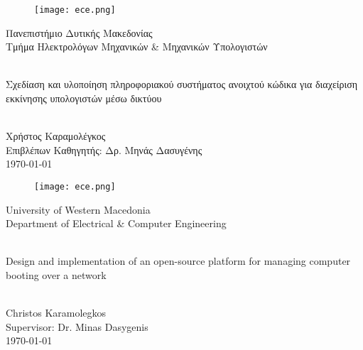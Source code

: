 \begin{titlepage}
	\begin{center}
		\begin{figure}[h]
			\centering \texttt{[image: ece.png]}
		\end{figure}
		{\LARGE Πανεπιστήμιο Δυτικής Μακεδονίας\\}
		{\Large Τμήμα Ηλεκτρολόγων Μηχανικών \& Μηχανικών Υπολογιστών}
		
		\begin{center}
			\vspace{2cm}
			
			\HRule \\[0.4cm]
			{\huge Σχεδίαση και υλοποίηση πληροφοριακού συστήματος ανοιχτού κώδικα για διαχείριση εκκίνησης υπολογιστών μέσω δικτύου\\}
			\HRule \\[0.4cm]
		\end{center}
		
		\vfill
		\begin{doublespacing}
			
			{\LARGE 
				Χρήστος Καραμολέγκος\\}
			{\Large Επιβλέπων Καθηγητής: Δρ. Μηνάς Δασυγένης\\}
			\vfill 
			{\Large \today}
		\end{doublespacing}
	\end{center}
\end{titlepage}

\blankpage

\begin{titlepage}
	\begin{center}
		\begin{figure}[h]
			\centering \texttt{[image: ece.png]}
		\end{figure}
		{\LARGE University of Western Macedonia\\}
		{\Large Department of Electrical \& Computer Engineering}
		
		\begin{center}
			\vspace{2cm}
			
			\HRule \\[0.4cm]
			{\huge Design and implementation of an open-source platform for managing computer booting over a network\\}
			\HRule \\[0.4cm]
		\end{center}
		
		\vfill
		\begin{doublespacing}
			
			{\LARGE 
				Christos Karamolegkos\\}
			{\Large Supervisor: Dr. Minas Dasygenis\\}
			\vfill
			{\Large \today}
		\end{doublespacing}
	\end{center}
\end{titlepage}
\afterpage{\blankpage}

